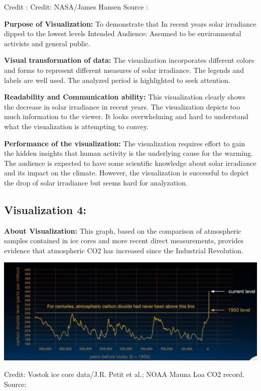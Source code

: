 \documentclass[]{book}
\begin{document}
Credit : Credit: NASA/James Hansen
Source : \citep{NASA}

\textbf{Purpose of Visualization:} To demonstrate that In recent years solar irradiance dipped to the lowest levels
Intended Audience: Assumed to be environmental activists and general public.

\textbf{Visual transformation of data:} The visualization incorporates different colors and forms to represent different measures of solar irradiance. The legends and labels are well used. The analyzed period is highlighted to seek attention.

\textbf{Readability and Communication ability:} This visualization clearly shows the decrease in solar irradiance in recent years. The visualization depicts too much information to the viewer. It looks overwhelming and hard to understand what the visualization is attempting to convey.

\textbf{Performance of the visualization:} The visualization requires effort to gain the hidden insights that human activity is the underlying cause for the warming. The audience is expected to have some scientific knowledge about solar irradiance and its impact on the climate. However, the visualization is successful to depict the drop of solar irradiance but seems hard for analyzation.

\hypertarget{visualization-4}{%
\subsection{Visualization 4:}\label{visualization-4}}

\textbf{About Visualization:} This graph, based on the comparison of atmospheric samples contained in ice cores and more recent direct measurements, provides evidence that atmospheric CO2 has increased since the Industrial Revolution.

\includegraphics{_images/Vz6-Co2.png}

Credit: Vostok ice core data/J.R. Petit et al.; NOAA Mauna Loa CO2 record.
Source:\citep{Co2}
\end{document}
